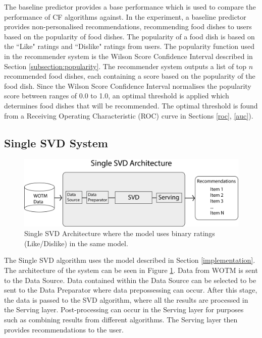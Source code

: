 The baseline predictor provides a base performance which is used to compare the performance of CF algorithms against. In the experiment, a baseline predictor provides non-personalised recommendations, recommending food dishes to users based on the popularity of food dishes. The popularity of a food dish is based on the ``Like" ratings and ``Dislike" ratings from users. The popularity function used in the recommender system is the Wilson Score Confidence Interval described in Section \ref{subsection:popularity}. The recommender system outputs a list of top $n$ recommended food dishes, each containing a score based on the popularity of the food dish. Since the Wilson Score Confidence Interval normalises the popularity score between ranges of 0.0 to 1.0, an optimal threshold is applied which determines food dishes that will be recommended. The optimal threshold is found from a Receiving Operating Characteristic (ROC) curve in Sections \ref{roc}, \ref{auc}).

\subsection{Single SVD System}

\begin{figure}
\centering
\includegraphics[scale=0.5]{recent_images/Single_ALS_architecture.png}
\caption{Single SVD Architecture where the model uses binary ratings (Like/Dislike) in the same model.}
\label{fig:single_architecture}
\end{figure}

The Single SVD algorithm uses the model described in Section \ref{implementation}. The architecture of the system can be seen in Figure \ref{fig:single_architecture}. Data from WOTM is sent to the Data Source. Data contained within the Data Source can be selected to be sent to the Data Preparator where data prepossessing can occur. After this stage, the data is passed to the SVD algorithm, where all the results are processed in the Serving layer. Post-processing can occur in the Serving layer for purposes such as combining results from different algorithms. The Serving layer then provides recommendations to the user.

